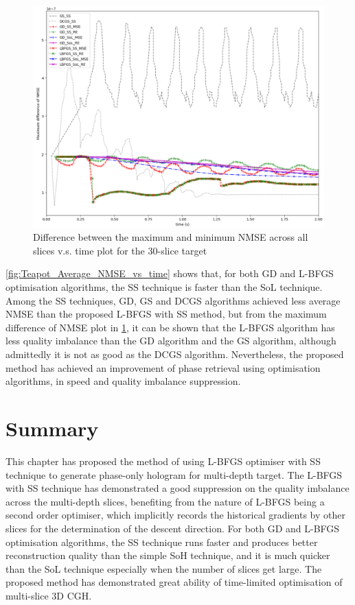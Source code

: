 \begin{figure}[H]
	\centering
	\includegraphics[width=1.0\textwidth]{Teapot_Max_diff_NMSE_vs_time}
	\caption{Difference between the maximum and minimum NMSE across all slices v.s. time plot for the 30-slice target}
	\label{fig:Teapot_Max_diff_NMSE_vs_time}
\end{figure}

\cref{fig:Teapot_Average_NMSE_vs_time} shows that, for both GD and L-BFGS optimisation algorithms, the SS technique is faster than the SoL technique. Among the SS techniques, GD, GS and DCGS algorithms achieved less average NMSE than the proposed L-BFGS with SS method, but from the maximum difference of NMSE plot in \cref{fig:Teapot_Max_diff_NMSE_vs_time}, it can be shown that the L-BFGS algorithm has less quality imbalance than the GD algorithm and the GS algorithm, although admittedly it is not as good as the DCGS algorithm. Nevertheless, the proposed method has achieved an improvement of phase retrieval using optimisation algorithms, in speed and quality imbalance suppression.


\section{Summary}
This chapter has proposed the method of using L-BFGS optimiser with SS technique to generate phase-only hologram for multi-depth target. The L-BFGS with SS technique has demonstrated a good suppression on the quality imbalance across the multi-depth slices, benefiting from the nature of L-BFGS being a second order optimiser, which implicitly records the historical gradients by other slices for the determination of the descent direction. For both GD and L-BFGS optimisation algorithms, the SS technique runs faster and produces better reconstruction quality than the simple SoH technique, and it is much quicker than the SoL technique especially when the number of slices get large. The proposed method has demonstrated great ability of time-limited optimisation of multi-slice 3D CGH.